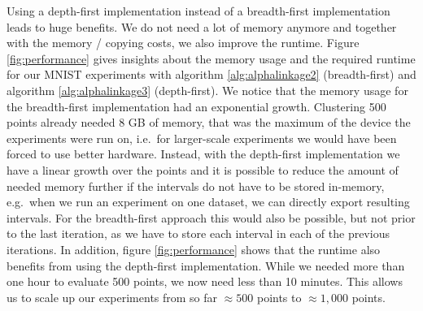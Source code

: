 Using a depth-first implementation instead of a breadth-first implementation leads to huge benefits. We do not need a lot of memory anymore and together with the memory / copying costs, we also improve the runtime. Figure \ref{fig:performance} gives insights about the memory usage and the required runtime for our MNIST experiments with algorithm \ref{alg:alphalinkage2} (breadth-first) and algorithm \ref{alg:alphalinkage3} (depth-first). We notice that the memory usage for the breadth-first implementation had an exponential growth. Clustering 500 points already needed 8 GB of memory, that was the maximum of the device the experiments were run on, i.e.\ for larger-scale experiments we would have been forced to use better hardware. Instead, with the depth-first implementation we have a linear growth over the points and it is possible to reduce the amount of needed memory further if the intervals do not have to be stored in-memory, e.g.\ when we run an experiment on one dataset, we can directly export resulting intervals. For the breadth-first approach this would also be possible, but not prior to the last iteration, as we have to store each interval in each of the previous iterations. In addition, figure \ref{fig:performance} shows that the runtime also benefits from using the depth-first implementation. While we needed more than one hour to evaluate 500 points, we now need less than 10 minutes. This allows us to scale up our experiments from so far $\approx 500$ points to $\approx 1,000$ points.

